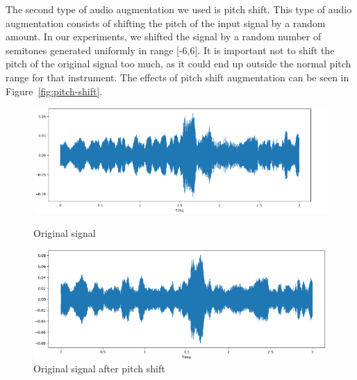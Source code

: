 The second type of audio augmentation we used is pitch shift. This type of audio augmentation consists of shifting the pitch of the input signal by a random amount. In our experiments, we shifted the signal by a random number of semitones generated uniformly in range [-6,6]. It is important not to shift the pitch of the original signal too much, as it could end up outside the normal pitch range for that instrument. The effects of pitch shift augmentation can be seen in Figure~\ref{fig:pitch-shift}.

\begin{figure}[H]
        \centering
        
        \begin{minipage}{0.49\textwidth}
            \centering
            \includegraphics[width=\linewidth]{images/pitch-shift-original-audio-intensity.png}
            \caption*{Original signal}
        \end{minipage}%
        \hfill%
        \begin{minipage}{0.49\textwidth}
            \centering
            \includegraphics[width=\linewidth]{images/pitch-shift-augmented-audio-intensity.png}
            \caption*{Original signal after pitch shift}
        \end{minipage}
        
        \vspace{0.5cm}
        

\end{figure}
